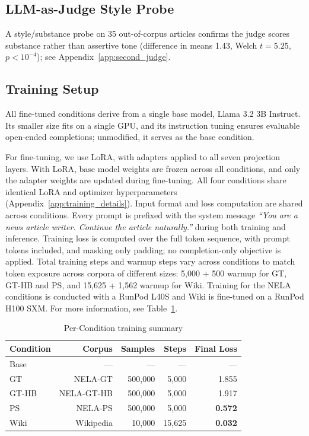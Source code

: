 \documentclass[11pt]{article}
\begin{document}
\subsection{LLM-as-Judge Style Probe}
A style/substance probe on 35 out-of-corpus articles confirms the judge scores substance rather than assertive tone (difference in means 1.43, Welch $t=5.25$, $p<10^{-4}$); see Appendix~\ref{app:second_judge}.


\subsection{Training Setup}

All fine-tuned conditions derive from a single base model, Llama 3.2 3B Instruct. 
Its smaller size fits on a single GPU, and its instruction tuning ensures evaluable open-ended completions; unmodified, it serves as the base condition.

For fine-tuning, we use LoRA, with adapters applied to all seven projection layers. 
With LoRA, base model weights are frozen across all conditions, and only the adapter weights are updated during fine-tuning. 
All four conditions share identical LoRA and optimizer hyperparameters (Appendix~\ref{app:training_details}).
Input format and loss computation are shared across conditions.
Every prompt is prefixed with the system message \textit{``You are a news article writer. Continue the article naturally.''} during both training and inference.
Training loss is computed over the full token sequence, with prompt tokens included, and masking only padding; no completion-only objective is applied.
Total training steps and warmup steps vary across conditions to match token exposure across corpora of different sizes: 5{,}000 + 500 warmup for GT, GT-HB and PS, and 15{,}625 + 1{,}562 warmup for Wiki.
Training for the NELA conditions is conducted with a RunPod L40S and Wiki is fine-tuned on a RunPod H100 SXM.
For more information, see Table~\ref{tab:training_conditions}.

\begin{table}[H]
  \centering
  \small
  \setlength{\tabcolsep}{3pt}
  \begin{tabular}{lrrrr}
    \toprule
    Condition & Corpus & Samples & Steps & Final Loss \\
    \midrule
    Base  & ---        & ---       & ---      & ---   \\
    GT    & NELA-GT    & 500{,}000 & 5{,}000  & 1.855 \\
    GT-HB & NELA-GT-HB & 500{,}000 & 5{,}000  & 1.917 \\
    PS    & NELA-PS    & 500{,}000 & 5{,}000  & \textbf{0.572} \\
    Wiki  & Wikipedia  & 10{,}000  & 15{,}625 & \textbf{0.032} \\
    \bottomrule
  \end{tabular}
  \caption{Per-Condition training summary}
  \label{tab:training_conditions}
\end{table}
\end{document}
